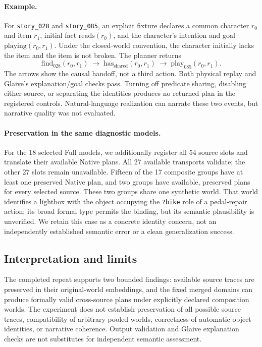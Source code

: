 \paragraph{Example.}
For \texttt{story\_028} and \texttt{story\_085}, an explicit fixture declares a common character $r_0$ and item $r_1$, initial fact $\mathrm{reads}(r_0)$, and the character's intention and goal $\mathrm{playing}(r_0,r_1)$. Under the closed-world convention, the character initially lacks the item and the item is not broken. The planner returns
\[
\mathrm{find}_{028}(r_0,r_1)
\;\to\;\mathrm{has}_{\mathrm{shared}}(r_0,r_1)
\;\to\;\mathrm{play}_{085}(r_0,r_1).
\]
The arrows show the causal handoff, not a third action. Both physical replay and Glaive's explanation/goal checks pass. Turning off predicate sharing, disabling either source, or separating the identities produces no returned plan in the registered controls. Natural-language realization can narrate these two events, but narrative quality was not evaluated.

\paragraph{Preservation in the same diagnostic models.}
For the 18 selected Full models, we additionally register all 54 source slots and translate their available Native plans. All 27 available transports validate; the other 27 slots remain unavailable. Fifteen of the 17 composite groups have at least one preserved Native plan, and two groups have available, preserved plans for every selected source. These two groups share one synthetic world. That world identifies a lightbox with the object occupying the \texttt{?bike} role of a pedal-repair action; its broad formal type permits the binding, but its semantic plausibility is unverified. We retain this case as a concrete identity concern, not an independently established semantic error or a clean generalization success.

\subsection{Interpretation and limits}

The completed repeat supports two bounded findings: available source traces are preserved in their original-world embeddings, and the fixed merged domains can produce formally valid cross-source plans under explicitly declared composition worlds. The experiment does not establish preservation of all possible source traces, compatibility of arbitrary pooled worlds, correctness of automatic object identities, or narrative coherence. Output validation and Glaive explanation checks are not substitutes for independent semantic assessment.

